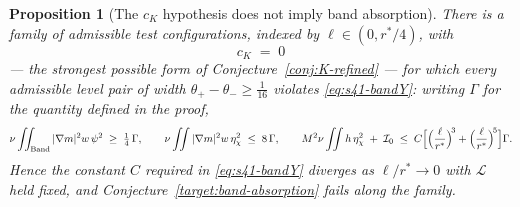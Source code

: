 \documentclass[11pt]{article}
\newtheorem{proposition}[theorem]{Proposition}
\theoremstyle{definition}
\theoremstyle{remark}
\begin{document}
\begin{proposition}[The $c_K$ hypothesis does not imply band absorption]
  \label{prop:s44-a-fails}
  There is a family of admissible test configurations, indexed by
  $\ell\in(0,r^*/4)$, with
  \[
    c_K \;=\; 0
  \]
  --- the strongest possible form of Conjecture~\ref{conj:K-refined} --- for
  which every admissible level pair of width
  $\theta_+-\theta_-\geq\tfrac1{16}$ violates \eqref{eq:s41-bandY}: writing
  $\Gamma$ for the quantity defined in the proof,
  \[
    \nu\iint_{\mathrm{Band}}|\nabla m|^2w\,\psi^2 \;\geq\;\tfrac14\,\Gamma,
    \qquad
    \nu\iint|\nabla m|^2w\,\eta_\chi^2 \;\leq\; 8\,\Gamma,
    \qquad
    M^2\nu\iint h\,\eta_\chi^2 \;+\;\mathcal{I}_0
    \;\leq\; C\Bigl[\Bigl(\frac{\ell}{r^*}\Bigr)^{\!3}
      +\Bigl(\frac{\ell}{r^*}\Bigr)^{\!5}\Bigr]\Gamma .
  \]
  Hence the constant $C$ required in \eqref{eq:s41-bandY} diverges as
  $\ell/r^*\to0$ with $\mathcal{L}$ held fixed, and
  Conjecture~\ref{target:band-absorption} fails along the family.
\end{proposition}
\end{document}
